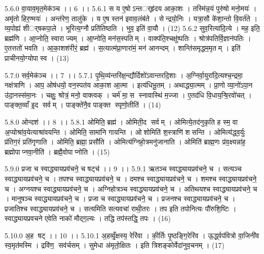 5.6.0
वा॒याव॒मृत॒मेक॑ञ्च ।। 6 ।।
5.6.1
स य ए॒षोऽन्तर््हृ॑दय आका॒शः । तस्मि॑न्न॒यं पुरु॑षो मनो॒मयः॑ । अमृ॑तो हिर॒ण्मयः॑ । अन्त॑रेण॒ तालु॑के । य ए॒ष स्तन॑ इवाव॒लंब॑ते । सेन्द्रयो॒निः । यत्रा॒सौ के॑शा॒न्तो वि॒वर्त॑ते । व्य॒पोह्य॑ शीर््षकपा॒ले । भूरित्य॒ग्नौ प्रति॑तिष्ठति । भुव॒ इति॑ वा॒यौ । (12)
5.6.2
सुव॒रित्या॑दि॒त्ये । मह॒ इति॒ ब्रह्म॑णि । आ॒प्नोति॒ स्वाराज्यम् । आ॒प्नोति॒ मन॑स॒स्पतिम् । वाक्प॑ति॒श्चक्षु॑ष्पतिः । श्रोत्र॑पतिर्वि॒ज्ञान॑पतिः । ए॒तत्ततो॑ भवति । आ॒का॒शश॑रीरं॒ ब्रह्म॑ । स॒त्यात्म॑प्रा॒णारा॑मं॒ मन॑ आनन्दम् । शान्ति॑समृद्धम॒मृतम् । इति॑ प्राचीनयो॒ग्योपास्व । (13)
\anuvakamend

5.7.0
सर्व॒मेक॑ञ्च ।। 7 ।।
5.7.1
पृ॒थि॒व्य॑न्तरि॑क्ष॒न्द्यौर्दिशो॑ऽवान्तरदि॒शाः । अ॒ग्निर्वा॒युरा॑दि॒त्यश्च॒न्द्रमा॒ नक्ष॑त्राणि । आप॒ ओष॑धयो॒ वन॒स्पत॑य आका॒श आ॒त्मा । इत्य॑धिभू॒तम् । अथाद्ध्या॒त्मम् । प्रा॒णो व्या॒नो॑ऽपा॒न उ॑दा॒नस्स॑मा॒नः । चक्षुः॒ श्रोत्रं॒ मनो॒ वाक्त्वक् । चर्म॑ मा॒स स्नावास्थि॑ म॒ज्जा । ए॒तद॑धि वि॒धाय॒ऱ्षि॒रवो॑चत् । पाङ्क्त॒व्वाँ इ॒द सर्वम् । पाङ्क्ते॑नै॒व पाङ्क्त॑ स्पृणो॒तीति॑ । (14)
\anuvakamend

5.8.0
ओन्दश॑ ।। 8 ।।
5.8.1
ओमिति॒ ब्रह्म॑ । ओमिती॒द सर्वम् । ओमित्ये॒तद॑नुकृति ह स्म॒ वा अ॒प्योश्रा॑व॒येत्याश्रा॑वयन्ति । ओमिति॒ सामा॑नि गायन्ति । ओशोमिति॑ श॒स्त्राणि॑ शसन्ति । ओमित्य॑द्ध्व॒र्युः प्र॑तिग॒रं प्रति॑गृणाति । ओमिति॒ ब्रह्मा॒ प्रसौ॑ति । ओमित्य॑ग्निहो॒त्रमनु॑जानाति । ओमिति॑ ब्राह्म॒णः प्र॑व॒क्ष्यन्ना॑ह॒ ब्रह्मोपाप्नवा॒नीति॑ । ब्रह्मै॒वोपाप्नोति । (15)
\anuvakamend

5.9.0
प्रजा च स्वाद्ध्यायप्रव॑चने॒ च षट्च॑ ।। 9 ।।
5.9.1
ऋतञ्च स्वाद्ध्यायप्रव॑चने॒ च । सत्यञ्च स्वाद्ध्यायप्रव॑चने॒ च । तपश्च स्वाद्ध्यायप्रव॑चने॒ च । दमश्च स्वाद्ध्यायप्रव॑चने॒ च । शमश्च स्वाद्ध्यायप्रव॑चने॒ च । अग्नयश्च स्वाद्ध्यायप्रव॑चने॒ च । अग्निहोत्रञ्च स्वाद्ध्यायप्रव॑चने॒ च । अतिथयश्च स्वाद्ध्यायप्रव॑चने॒ च । मानुषञ्च स्वाद्ध्यायप्रव॑चने॒ च । प्रजा च स्वाद्ध्यायप्रव॑चने॒ च । प्रजनश्च स्वाद्ध्यायप्रव॑चने॒ च । प्रजातिश्च स्वाद्ध्यायप्रव॑चने॒ च । सत्यमिति सत्यवचा॑ राथी॒तरः । तप इति तपोनित्यः पौ॑रुशि॒ष्टिः । स्वाद्ध्यायप्रवचने एवेति नाको॑ मौद्ग॒ल्यः । तद्धि तप॑स्तद्धि॒ तपः । (16)
\anuvakamend

5.10.0
अ॒ह षट् ।। 10 ।।
5.10.1
अ॒हव्वृँ॒क्षस्य॒ रेरि॑वा । की॒र्तिः पृ॒ष्ठङ्गि॒रेरि॑व । ऊ॒र्द्ध्वप॑वित्रो वा॒जिनी॑व स्व॒मृत॑मस्मि । द्रवि॑ण॒ सव॑र्चसम् । सुमेधा अ॑मृतो॒क्षितः । इति त्रिशङ्कोर्वेदा॑नुव॒चनम् । (17)
\anuvakamend

